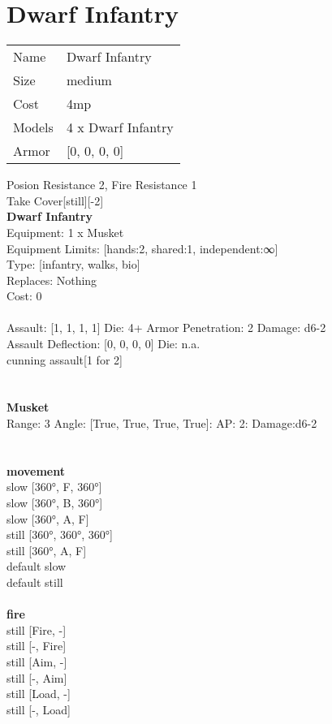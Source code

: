 \pagebreak

\section{ Dwarf Infantry }

\begin{tabular}{ll}
  Name & Dwarf Infantry \\
  Size & medium\\
  Cost & 4mp\\
  Models & 4 x Dwarf Infantry\\
  Armor & [0, 0, 0, 0]\\
\end{tabular}

\noindent Posion Resistance 2, Fire Resistance 1\\ 
Take Cover[still][-2]\\ 


{\bf Dwarf Infantry } \\
Equipment: 1 x Musket \\
Equipment Limits: [hands:2, shared:1, independent:∞] \\
Type: [infantry, walks, bio] \\
Replaces: Nothing \\
Cost: 0\\
\ \\
Assault: [1, 1, 1, 1] Die: 4+ Armor Penetration: 2 Damage: d6-2 \\
Assault Deflection: [0, 0, 0, 0] Die: n.a.\\
\indent cunning assault[1 for 2]\\ 
 
\ \\

\ \\
{\bf Musket } \\



Range: 3  Angle: [True, True, True, True]: AP: 2: Damage:d6-2 \\




 
\ \\



\ \\ {\bf movement } \\
slow [360°, F, 360°] \\
slow [360°, B, 360°] \\
slow [360°, A, F] \\
still [360°, 360°, 360°] \\
still [360°, A, F] \\
default slow \\
default still \\
\ \\ {\bf fire } \\
still [Fire, -] \\
still [-, Fire] \\
still [Aim, -] \\
still [-, Aim] \\
still [Load, -] \\
still [-, Load] \\



